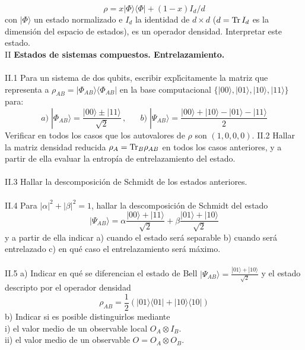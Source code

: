 \documentclass[12pt]{article}
\begin{document}
\[\rho=x|\Phi\rangle\langle\Phi|+(1-x)I_d/d\]
con $|\Phi\rangle$ un estado normalizado e $I_d$ la identidad de $d\times d$ ($d={\rm Tr}\, I_d$ es la dimensi\'on del espacio de estados), es un operador densidad. Interpretar este estado. \\\hfill\break
II {\bf Estados de sistemas compuestos. Entrelazamiento.}\\\\
\noindent
II.1 Para un sistema de dos qubits, escribir expl\'{\i}citamente la matriz que representa a 
$\rho_{AB}=|\Phi_{AB}\rangle\langle\Phi_{AB}|$ en la base computacional  
$\{|00\rangle,|01\rangle,|10\rangle,|11\rangle\}$ para:\\ 	
\[ a)\; %
|\Phi_{AB}\rangle=\frac{|00\rangle\pm|11\rangle}{\sqrt{2}}\,,\;\;\;\;\;\;
b) \;|\Psi_{AB}\rangle=\frac{|00\rangle+|10\rangle-|01\rangle-|11\rangle}{2}\]%
Verificar  en todos los casos que los autovalores de $\rho$ son $(1,0,0,0)$. \hfill\break
\newpage
\noindent
II.2 Hallar la matriz densidad reducida $\rho_A={\rm Tr}_B\rho_{AB}$ en todos los casos anteriores, y a partir de ella evaluar la entropía de entrelazamiento del estado.\\ \\%
II.3  Hallar la descomposici\'on de Schmidt de los estados anteriores. \\\\
II.4 Para $|\alpha|^2+|\beta|^2=1$, hallar la descomposici\'on de Schmidt del estado  \[{\textstyle|\Psi_{AB}\rangle=\alpha\frac{|00\rangle+|11\rangle}{\sqrt{2}}+\beta
\frac{|01\rangle+|10\rangle}{\sqrt{2}}}\]
y a partir de ella indicar a) cuando el estado ser\'a separable b) cuando ser\'a entrelazado c) en qu\'e caso el entrelazamiento ser\'a m\'aximo.\\\\
II.5 a) Indicar en qu\'e se diferencian el estado de Bell $|\Psi_{AB}\rangle=\frac{|01\rangle+|10\rangle}{\sqrt{2}}$ y el estado descripto por el operador densidad \[\rho_{AB}=\frac{1}{2}(|01\rangle\langle 01|+|10\rangle\langle 10|)\]
b) Indicar si es posible distinguirlos mediante \\
i) el valor medio de un observable local 
$ O_A\otimes I_B$. \\
ii) el valor medio de un observable $O=O_A\otimes O_B$.  

\end{document}
